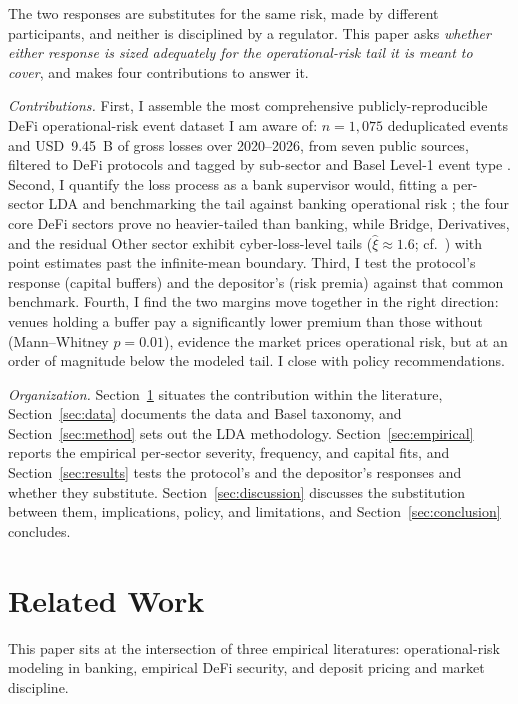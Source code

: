 \documentclass[runningheads]{llncs}
\begin{document}
The two responses are substitutes for the same risk, made by
different participants, and neither is disciplined by a regulator.
This paper asks \emph{whether either response is sized adequately for
the operational-risk tail it is meant to cover}, and makes four 
contributions to answer it.

\emph{Contributions.} First, I assemble the most comprehensive
publicly-reproducible DeFi operational-risk event dataset I am aware of:
$n=1{,}075$ deduplicated events and USD~9.45~B of gross losses over
2020--2026, from seven public sources, filtered to DeFi
protocols and tagged by sub-sector and Basel Level-1 event type
\citep{BCBS2006}. Second, I quantify the loss process as a bank
supervisor would, fitting a per-sector LDA and benchmarking the tail
against banking operational risk
\citep{Moscadelli2004,Fontnouvelle2006,Cope2009}; the four core DeFi
sectors prove no heavier-tailed than banking, while Bridge, Derivatives, and
the residual Other sector exhibit cyber-loss-level tails
($\hat\xi \approx 1.6$; cf.~\cite{Eling2019}) with point estimates past the
infinite-mean boundary. Third, I test the
protocol's response (capital buffers) and the depositor's (risk premia)
against that common benchmark. Fourth, I find the two margins move
together in the right direction: venues holding a buffer pay a
significantly lower premium than those without (Mann--Whitney $p=0.01$),
evidence the market prices operational risk, but at an order of magnitude
below the modeled tail. I close with policy recommendations.

\emph{Organization.} Section~\ref{sec:lit} situates the
contribution within the literature, Section~\ref{sec:data} documents the
data and Basel taxonomy, and Section~\ref{sec:method} sets out the LDA
methodology. Section~\ref{sec:empirical} reports the empirical
per-sector severity, frequency, and capital fits, and
Section~\ref{sec:results} tests the protocol's and the depositor's
responses and whether they substitute. Section~\ref{sec:discussion} discusses the
substitution between them, implications, policy, and limitations, and
Section~\ref{sec:conclusion} concludes.

\section{Related Work}\label{sec:lit}

This paper sits at the intersection of three empirical literatures:
operational-risk modeling in banking, empirical DeFi security, and 
deposit pricing and market discipline.
\end{document}
